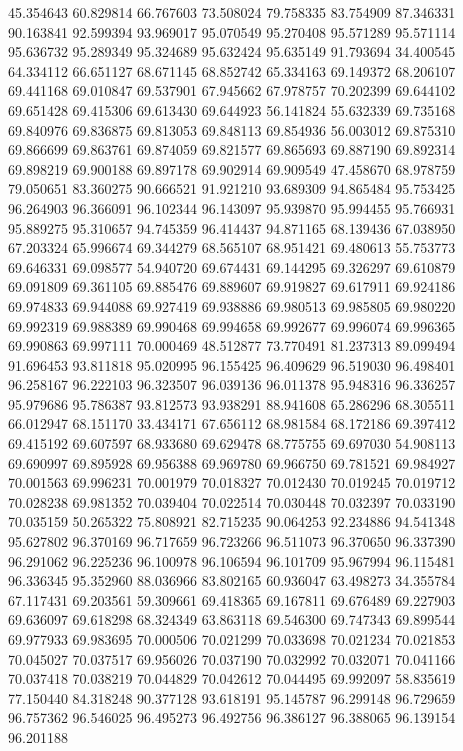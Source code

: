 45.354643
60.829814
66.767603
73.508024
79.758335
83.754909
87.346331
90.163841
92.599394
93.969017
95.070549
95.270408
95.571289
95.571114
95.636732
95.289349
95.324689
95.632424
95.635149
91.793694
34.400545
64.334112
66.651127
68.671145
68.852742
65.334163
69.149372
68.206107
69.441168
69.010847
69.537901
67.945662
67.978757
70.202399
69.644102
69.651428
69.415306
69.613430
69.644923
56.141824
55.632339
69.735168
69.840976
69.836875
69.813053
69.848113
69.854936
56.003012
69.875310
69.866699
69.863761
69.874059
69.821577
69.865693
69.887190
69.892314
69.898219
69.900188
69.897178
69.902914
69.909549
47.458670
68.978759
79.050651
83.360275
90.666521
91.921210
93.689309
94.865484
95.753425
96.264903
96.366091
96.102344
96.143097
95.939870
95.994455
95.766931
95.889275
95.310657
94.745359
96.414437
94.871165
68.139436
67.038950
67.203324
65.996674
69.344279
68.565107
68.951421
69.480613
55.753773
69.646331
69.098577
54.940720
69.674431
69.144295
69.326297
69.610879
69.091809
69.361105
69.885476
69.889607
69.919827
69.617911
69.924186
69.974833
69.944088
69.927419
69.938886
69.980513
69.985805
69.980220
69.992319
69.988389
69.990468
69.994658
69.992677
69.996074
69.996365
69.990863
69.997111
70.000469
48.512877
73.770491
81.237313
89.099494
91.696453
93.811818
95.020995
96.155425
96.409629
96.519030
96.498401
96.258167
96.222103
96.323507
96.039136
96.011378
95.948316
96.336257
95.979686
95.786387
93.812573
93.938291
88.941608
65.286296
68.305511
66.012947
68.151170
33.434171
67.656112
68.981584
68.172186
69.397412
69.415192
69.607597
68.933680
69.629478
68.775755
69.697030
54.908113
69.690997
69.895928
69.956388
69.969780
69.966750
69.781521
69.984927
70.001563
69.996231
70.001979
70.018327
70.012430
70.019245
70.019712
70.028238
69.981352
70.039404
70.022514
70.030448
70.032397
70.033190
70.035159
50.265322
75.808921
82.715235
90.064253
92.234886
94.541348
95.627802
96.370169
96.717659
96.723266
96.511073
96.370650
96.337390
96.291062
96.225236
96.100978
96.106594
96.101709
95.967994
96.115481
96.336345
95.352960
88.036966
83.802165
60.936047
63.498273
34.355784
67.117431
69.203561
59.309661
69.418365
69.167811
69.676489
69.227903
69.636097
69.618298
68.324349
63.863118
69.546300
69.747343
69.899544
69.977933
69.983695
70.000506
70.021299
70.033698
70.021234
70.021853
70.045027
70.037517
69.956026
70.037190
70.032992
70.032071
70.041166
70.037418
70.038219
70.044829
70.042612
70.044495
69.992097
58.835619
77.150440
84.318248
90.377128
93.618191
95.145787
96.299148
96.729659
96.757362
96.546025
96.495273
96.492756
96.386127
96.388065
96.139154
96.201188

